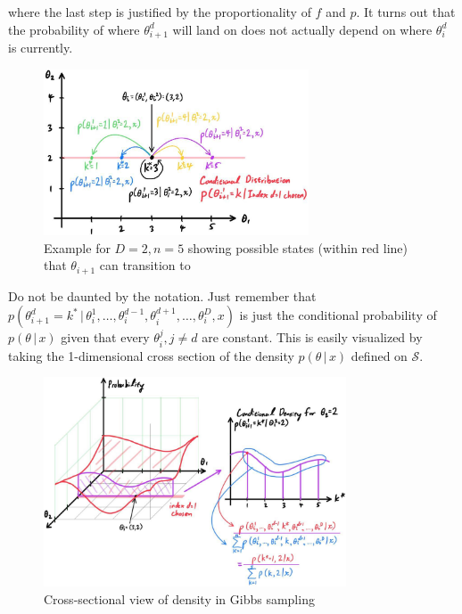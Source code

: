 \documentclass{article}
\begin{document}
\begin{enumerate}
    where the last step is justified by the proportionality of $f$ and $p$. It turns out that the probability of where $\theta_{i+1}^d$ will land on does not actually depend on where $\theta_{i}^d$ is currently.
  \end{enumerate}

  \begin{figure}[H]
    \centering
    \includegraphics[width=0.7\textwidth]{img/example_gibbs_1.jpg}
    \caption{Example for $D=2, n=5$ showing possible states (within red line) that $\theta_{i+1}$ can transition to}
  \end{figure}

  Do not be daunted by the notation. Just remember that $p(\theta_{i+1}^d = k^* \,|\,\theta_i^1, \ldots, \theta_i^{d-1}, \theta_i^{d+1}, \ldots, \theta_i^D, x)$ is just the conditional probability of $p(\theta\,|\,x)$ given that every $\theta_i^j, j \neq d$ are constant. This is easily visualized by taking the 1-dimensional cross section of the density $p(\theta\,|\,x)$ defined on $\mathcal{S}$.

  \begin{figure}[H]
    \centering
    \includegraphics[width=0.8\textwidth]{img/Gibbs_step_2.jpg}
    \caption{Cross-sectional view of density in Gibbs sampling}
  \end{figure}
\end{document}
